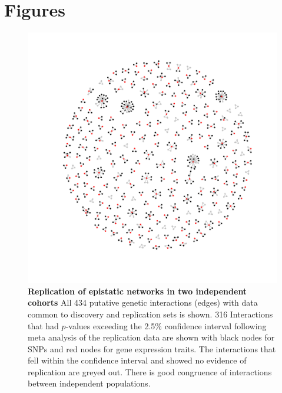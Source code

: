 \documentclass{article}
\begin{document}
\clearpage
\section{Figures}

\begin{figure}[H]
	\centering
	\includegraphics[width=5in]{Grey_graph_of_interactions_2_lists.pdf}
	\caption{\textbf{Replication of epistatic networks in two independent cohorts} All 434 putative genetic interactions (edges) with data common to discovery and replication sets is shown. 316 Interactions that had $p$-values exceeding the 2.5\% confidence interval following meta analysis of the replication data are shown with black nodes for SNPs and red nodes for gene expression traits. The interactions that fell within the confidence interval and showed no evidence of replication are greyed out. There is good congruence of interactions between independent populations.}
	\label{fig:fireworks}
\end{figure}
\clearpage
\end{document}
